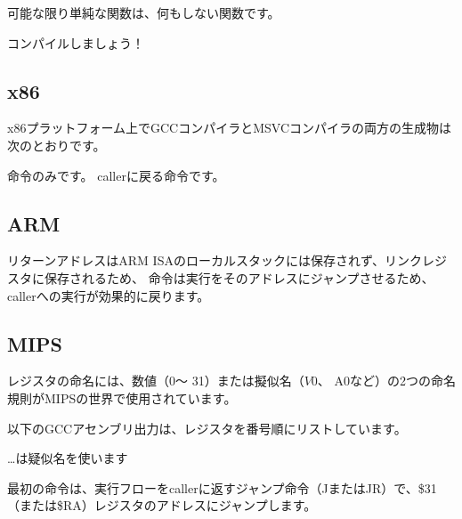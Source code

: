 \label{empty_func}

可能な限り単純な関数は、何もしない関数です。



コンパイルしましょう！

\subsection{x86}

x86プラットフォーム上でGCCコンパイラとMSVCコンパイラの両方の生成物は次のとおりです。



\RET 命令のみです。 \gls{caller}に戻る命令です。

\subsection{ARM}



リターンアドレスはARM \ac{ISA}のローカルスタックには保存されず、リンクレジスタに保存されるため、
命令は実行をそのアドレスにジャンプさせるため、\gls{caller}への実行が効果的に戻ります。

\subsection{MIPS}

レジスタの命名には、数値（$ 0〜$ 31）または擬似名（$ V0、$ A0など）の2つの命名規則がMIPSの世界で使用されています。

以下のGCCアセンブリ出力は、レジスタを番号順にリストしています。



\dots \IDA は疑似名を使います



最初の命令は、実行フローを\gls{caller}に返すジャンプ命令（JまたはJR）で、\$31（または\$RA）レジスタのアドレスにジャンプします。

